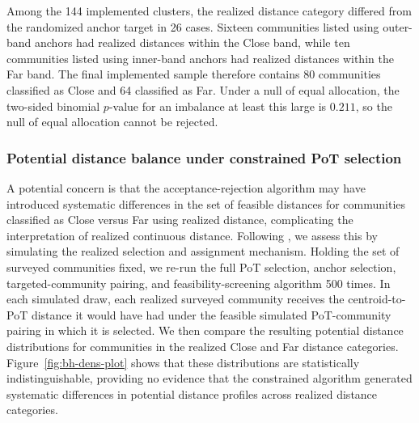 \documentclass[ECM\space ReStud.tex]{subfiles}
\begin{document}
Among the 144 implemented clusters, the realized distance category differed from the randomized anchor target in 26 cases. Sixteen communities listed using outer-band anchors had realized distances within the Close band, while ten communities listed using inner-band anchors had realized distances within the Far band. The final implemented sample therefore contains 80 communities classified as Close and 64 classified as Far. Under a null of equal allocation, the two-sided binomial \(p\)-value for an imbalance at least this large is \(0.211\), so the null of equal allocation cannot be rejected.




\newpage

\subsubsection*{Potential distance balance under constrained PoT selection}

A potential concern is that the acceptance-rejection algorithm may have introduced systematic differences in the set of feasible distances for communities classified as Close versus Far using realized distance, complicating the interpretation of realized continuous distance. Following \citet{borusyak2023nonrandom}, we assess this by simulating the realized selection and assignment mechanism. Holding the set of surveyed communities fixed, we re-run the full PoT selection, anchor selection, targeted-community pairing, and feasibility-screening algorithm 500 times. In each simulated draw, each realized surveyed community receives the centroid-to-PoT distance it would have had under the feasible simulated PoT-community pairing in which it is selected. We then compare the resulting potential distance distributions for communities in the realized Close and Far distance categories. Figure~\ref{fig:bh-dens-plot} shows that these distributions are statistically indistinguishable, providing no evidence that the constrained algorithm generated systematic differences in potential distance profiles across realized distance categories.
\end{document}
